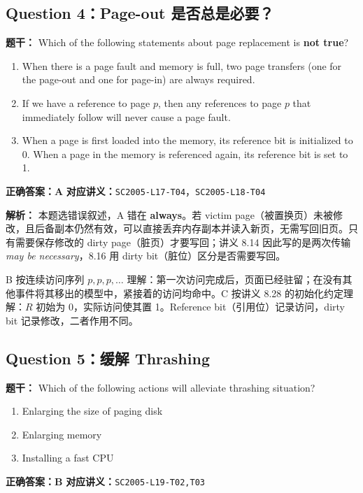 \documentclass[11pt,a4paper,fontset=fandol]{ctexart}
\renewcommand{\exercisequestion}[2]{%
  \Needspace{5\baselineskip}%
  \subsection{#2}\label{exercise:#1}%
}
\renewenvironment{checkedsolution}
  {\par\nopagebreak[4]\textbf{解析：}\ignorespaces}
  {\par}
\begin{document}
\exercisequestion{SC2005-HW06-Q04}{Question 4：Page-out 是否总是必要？}

\textbf{题干：} Which of the following statements about page replacement is \textbf{not true}?

\begin{enumerate}[label=\Alph*.,leftmargin=2.4em]
  \item When there is a page fault and memory is full, two page transfers (one for the page-out and one for page-in) are always required.
  \item If we have a reference to page $p$, then any references to page $p$ that immediately follow will never cause a page fault.
  \item When a page is first loaded into the memory, its reference bit is initialized to 0. When a page in the memory is referenced again, its reference bit is set to 1.
\end{enumerate}

\textbf{正确答案：A}\qquad
\textbf{对应讲义：}\texttt{SC2005-L17-T04}，\texttt{SC2005-L18-T04}

\begin{checkedsolution}
本题选错误叙述，A 错在 \textbf{always}。若 victim page（被置换页）未被修改，且后备副本仍然有效，可以直接丢弃内存副本并读入新页，无需写回旧页。只有需要保存修改的 dirty page（脏页）才要写回；讲义 8.14 因此写的是两次传输 \emph{may be necessary}，8.16 用 dirty bit（脏位）区分是否需要写回。

B 按连续访问序列 $p,p,p,\ldots$ 理解：第一次访问完成后，页面已经驻留；在没有其他事件将其移出的模型中，紧接着的访问均命中。C 按讲义 8.28 的初始化约定理解：$R$ 初始为 0，实际访问使其置 1。Reference bit（引用位）记录访问，dirty bit 记录修改，二者作用不同。
\end{checkedsolution}

\exercisequestion{SC2005-HW06-Q05}{Question 5：缓解 Thrashing}

\textbf{题干：} Which of the following actions will alleviate thrashing situation?

\begin{enumerate}[label=\Alph*.,leftmargin=2.4em]
  \item Enlarging the size of paging disk
  \item Enlarging memory
  \item Installing a fast CPU
\end{enumerate}

\textbf{正确答案：B}\qquad
\textbf{对应讲义：}\texttt{SC2005-L19-T02,T03}
\end{document}
